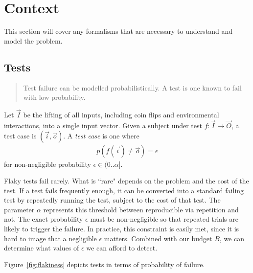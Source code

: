 \section{Context}
\label{sec:context}

This section will cover any formalisms that are necessary to understand and model the problem.


\subsection{\Flaky Tests}
\label{sec:sec:flaky_tests}

\begin{quote}
	Test failure can be modelled probabilistically. A \flaky test is one known to
	fail with low probability.
\end{quote}


\begin{defn}
  \label{def:flaky_test}

Let $\vec{I}$ be the lifting of all inputs, including coin flips and
environmental interactions, into a single input vector. Given a subject
under test $f: \vec{I} \rightarrow \vec{O}$, a test case is
$(\vec{i},\vec{o})$. A \emph{\flaky test case} is one
where
%
\begin{align*}
  p(f(\vec{i}) \ne \vec{o}) = \epsilon
\end{align*}
%
for non-negligible probability $\epsilon \in (0..\alpha]$.

\end{defn}

Flaky tests fail rarely.  What is “rare" depends on the problem and the cost of
the test.  If a test fails frequently enough, it can be converted into a
standard failing test by repeatedly running the test, subject to the cost of
that test.  The parameter $\alpha$ represents this threshold between
reproducible via repetition and not.  The exact probability $\epsilon$ must be
non-negligible so that repeated trials are likely to trigger the failure.  In
practice, this constraint is easily met, since it is hard to image that a
negligible $\epsilon$ matters.  Combined with our budget $B$, we can determine
what values of $\epsilon$ we can afford to detect. 

Figure~\ref{fig:flakiness} depicts \flaky tests in terms of probability of
failure.


